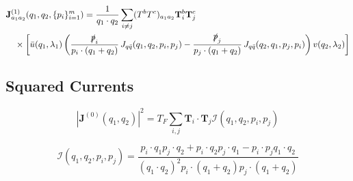 \documentclass[a4paper,11pt]{article}
\begin{document}
\begin{equation}
\begin{split}
 &\mathbf{J}^{(1)}_{a_1 a_2}(q_1,q_2, \{ p_i \}_{i=1}^m ) =  \frac{1}{q_1 \cdot q_2} \sum_{i\neq j} (T^bT^c)_{a_1a_2} \mathbf{T}^b_i \mathbf{T}^c_j \, \\
  & \quad \times \left[ \bar{u}(q_1,\lambda_1) \left( \frac{\slashed{p}_i}{p_i \cdot (q_1 + q_2)} \, J_{q\bar{q}}(q_1,q_2, p_i, p_j)  - \frac{\slashed{p}_j}{p_j \cdot (q_1 + q_2)} \, J_{q\bar{q}}(q_2,q_1, p_j, p_i) \right) v(q_2,\lambda_2) \right] 
\end{split}
\end{equation}

\subsection{Squared Currents}
\begin{equation}
|\mathbf{J}^{(0)}(q_1, q_2)|^2 = T_F \sum_{i, j} \mathbf{T}_i \cdot \mathbf{T}_j \mathcal{I}(q_1, q_2, p_i, p_j)
\end{equation}

\begin{equation}
\mathcal{I}(q_1, q_2, p_i, p_j) = \frac{p_i \cdot q_1 p_j \cdot q_2 + p_i \cdot q_2 p_j \cdot q_1 - p_i \cdot p_j q_1 \cdot q_2}{(q_1 \cdot q_2)^2 p_i \cdot (q_1 + q_2) p_j \cdot (q_1 + q_2)}
\end{equation}
\end{document}
